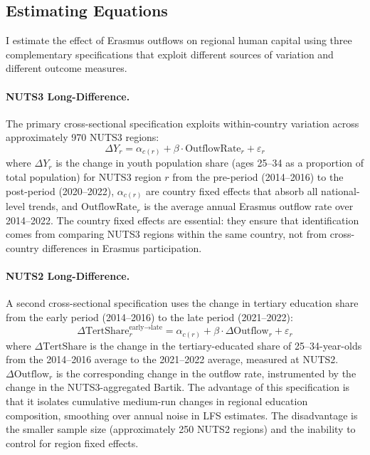 \documentclass[12pt]{article}
\begin{document}
\subsection{Estimating Equations}

I estimate the effect of Erasmus outflows on regional human capital using three complementary specifications that exploit different sources of variation and different outcome measures.

\paragraph{NUTS3 Long-Difference.} The primary cross-sectional specification exploits within-country variation across approximately 970 NUTS3 regions:
\begin{equation}
\Delta Y_{r} = \alpha_{c(r)} + \beta \cdot \text{OutflowRate}_{r} + \varepsilon_{r}
\label{eq:nuts3_ld}
\end{equation}
where $\Delta Y_{r}$ is the change in youth population share (ages 25--34 as a proportion of total population) for NUTS3 region $r$ from the pre-period (2014--2016) to the post-period (2020--2022), $\alpha_{c(r)}$ are country fixed effects that absorb all national-level trends, and $\text{OutflowRate}_{r}$ is the average annual Erasmus outflow rate over 2014--2022. The country fixed effects are essential: they ensure that identification comes from comparing NUTS3 regions within the same country, not from cross-country differences in Erasmus participation.

\paragraph{NUTS2 Long-Difference.} A second cross-sectional specification uses the change in tertiary education share from the early period (2014--2016) to the late period (2021--2022):
\begin{equation}
\Delta \text{TertShare}_{r}^{\text{early} \to \text{late}} = \alpha_{c(r)} + \beta \cdot \Delta \text{Outflow}_{r} + \varepsilon_{r}
\label{eq:nuts2_ld}
\end{equation}
where $\Delta \text{TertShare}$ is the change in the tertiary-educated share of 25--34-year-olds from the 2014--2016 average to the 2021--2022 average, measured at NUTS2. $\Delta \text{Outflow}_{r}$ is the corresponding change in the outflow rate, instrumented by the change in the NUTS3-aggregated Bartik. The advantage of this specification is that it isolates cumulative medium-run changes in regional education composition, smoothing over annual noise in LFS estimates. The disadvantage is the smaller sample size (approximately 250 NUTS2 regions) and the inability to control for region fixed effects.
\end{document}
